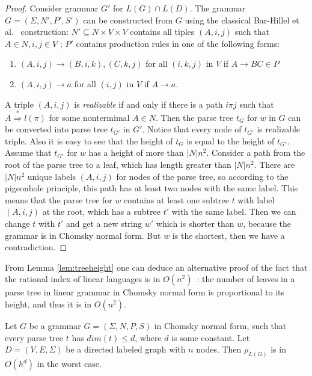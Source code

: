 \begin{proof}
Consider grammar $G'$ for $L(G)\cap L(D)$. The grammar $G = (\Sigma, N', P', S')$ can be constructed from $G$ using the classical Bar-Hillel et al.~\cite{BarHillel} construction: $N' \subseteq N \times V \times V $  contains all tiples $(A, i, j)$ such that $A \in N, i, j \in V$ ; $P'$ contains production rules in one of the following forms:
\begin{enumerate}
\item $(A, i, j) \rightarrow (B, i, k), (C, k, j)$ for all $(i, k, j)$ in $V$  if $A \rightarrow BC \in P$
\item $(A, i, j) \rightarrow a$ for all $(i, j)$ in $V$ if $A \rightarrow a$.
\end{enumerate}
A triple $(A, i, j)$ is \textit{realizable} if and only if there is a path $i\pi j$ such that $A \stackrel {*}{\Rightarrow } l(\pi)$ for some nontermimal $A \in N$. Then the parse tree $t_G$ for $w$ in $G$ can be converted into parse tree $t_{G'}$ in $G'$. Notice that every node of $t_{G'}$ is realizable triple. Also it is easy to see that the height of $t_G$ is equal to the height of $t_{G'}$. Assume that $t_{G'}$ for $w$ has a height of more than $|N|n^2$. Consider a path from the root of the parse tree to a leaf, which has length greater than $|N|n^2$. There are $|N|n^2$ unique labels $(A, i, j)$ for nodes of the parse tree, so according to the pigeonhole principle, this path has at least two nodes with the same label. This means that the parse tree for $w$ contains at least one subtree $t$ with label $(A, i, j)$ at the root, which has a subtree $t'$ with the same label. Then we can change $t$ with $t'$ and get a new string $w'$ which is shorter than $w$, because the grammar is in Chomsky normal form. But $w$ is the shortest, then we have a contradiction.

\end{proof}
From Lemma \ref{lem:treeheight} one can deduce an alternative proof of the fact that the rational index of linear languages is in $O(n^2)$~\cite{RatBasic}: the number of leaves in a parse tree in linear grammar in Chomsky normal form is proportional to its height, and thus it is in $O(n^2)$.
\begin{lemma}
\label{oscbnddim}
Let $G$ be a grammar $G = (\Sigma, N, P, S)$ in Chomsky normal form, such that every parse tree $t$ has $dim(t) \le d$, where $d$ is some constant. Let $D=(V, E, \Sigma)$ be a directed labeled graph with $n$ nodes. Then $\rho_{L(G)}$ is in $O(h^d)$ in the worst case.
\end{lemma}
